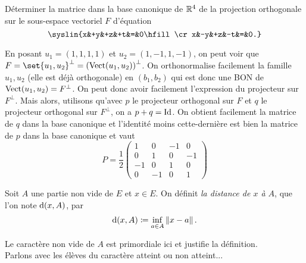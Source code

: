 \documentclass{magnolia}
\begin{document}
  \begin{exoUnique}
  \exo Déterminer la matrice dans la base canonique de $\mathbb{R}^4$ de la
    projection orthogonale sur le sous-espace vectoriel $F$ d'équation
    \[\syslin{x&+y&+z&+t&=&0\hfill\cr
              x&-y&+z&-t&=&0.}\]
    \begin{sol}
    En posant $u_1=(1,1,1,1)$ et $u_2=(1,-1,1,-1)$, on peut voir que $F=\set{u_1,u_2}^\perp=\p{\vect(u_1,u_2)}^\perp$. On orthonormalise facilement la famille $u_1, u_2$ (elle est déjà orthogonale) en $(b_1,b_2)$ qui est donc une BON de $\operatorname{Vect}(u_1,u_2)=F^\perp$. On peut donc avoir facilement l'expression du projecteur sur $F^\perp$. Mais alors, utilisons qu'avec $p$ le projecteur orthogonal sur $F$ et $q$ le projecteur orthogonal sur $F^\perp$, on a $p+q=\operatorname{Id}$. On obtient facilement la matrice de $q$ dans la base canonique et l'identité moins cette-dernière est bien la matrice de $p$ dans la base canonique et vaut
    \[P=\frac{1}{2}
      \begin{pmatrix}
      1 & 0 & -1 & 0\\
      0 & 1 & 0 & -1\\
      -1 & 0 & 1 & 0\\
      0 & -1 & 0 & 1
      \end{pmatrix}\]
    \end{sol}
  \end{exoUnique}





\begin{definition}[utile=-3]
Soit $A$ une partie non vide de  $E$ et $x\in E$. On définit
\emph{la distance de $x$ à $A$}, que l'on note ${\rm d}(x,A)$, par
\[{\rm d}(x,A)\coloneqq\inf_{a\in A} \left\|x-a\right\|.\]
\end{definition}

\begin{preuve}
Le caractère non vide de $A$ est primordiale ici et justifie la définition.\\
Parlons avec les élèves du caractère atteint ou non atteint...
\end{preuve}
\end{document}
